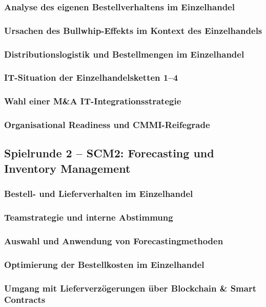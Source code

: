 \documentclass[a4paper,12pt]{article}
\begin{document}
\subsubsection{Analyse des eigenen Bestellverhaltens im Einzelhandel}
\subsubsection{Ursachen des Bullwhip-Effekts im Kontext des Einzelhandels}
\subsubsection{Distributionslogistik und Bestellmengen im Einzelhandel}
\subsubsection{IT-Situation der Einzelhandelsketten 1–4}
\subsubsection{Wahl einer M\&A IT-Integrationsstrategie}
\subsubsection{Organisational Readiness und CMMI-Reifegrade}

\subsection{Spielrunde 2 – SCM2: Forecasting und Inventory Management}
\subsubsection{Bestell- und Lieferverhalten im Einzelhandel}
\subsubsection{Teamstrategie und interne Abstimmung}
\subsubsection{Auswahl und Anwendung von Forecastingmethoden}
\subsubsection{Optimierung der Bestellkosten im Einzelhandel}
\subsubsection{Umgang mit Lieferverzögerungen über Blockchain \& Smart Contracts}
\end{document}
